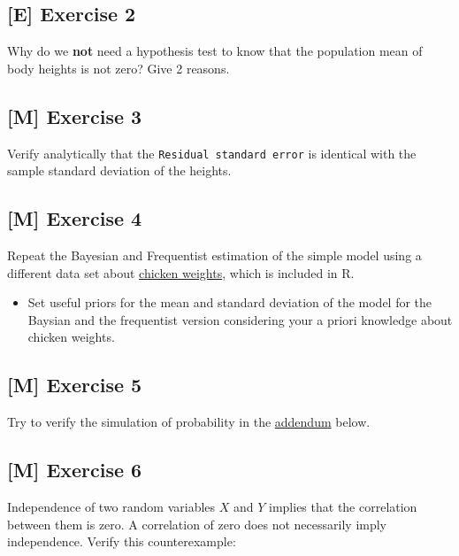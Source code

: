 \documentclass[
]{book}
\providecommand{\tightlist}{%
  \setlength{\itemsep}{0pt}\setlength{\parskip}{0pt}}
\begin{document}
\subsection{{[}E{]} Exercise 2}\label{exercise2_Intro}

Why do we \textbf{not} need a hypothesis test to know that the population mean of body heights is not zero?
Give 2 reasons.

\subsection{{[}M{]} Exercise 3}\label{exercise3_Intro}

Verify analytically that the \texttt{Residual\ standard\ error} is identical with
the sample standard deviation of the heights.

\subsection{{[}M{]} Exercise 4}\label{exercise4_Intro}

Repeat the Bayesian and Frequentist estimation of the simple model using a different data set about
\href{https://stat.ethz.ch/R-manual/R-devel/library/datasets/html/ChickWeight.html}{chicken weights},
which is included in R.

\begin{itemize}
\tightlist
\item
  Set useful priors for the mean and standard deviation of the model
  for the Baysian and the frequentist version considering
  your a priori knowledge about chicken weights.
\end{itemize}

\subsection{{[}M{]} Exercise 5}\label{exercise5_Intro}

Try to verify the simulation of probability in the \hyperref[addendum]{addendum} below.

\subsection{{[}M{]} Exercise 6}\label{exercise6_Intro}

Independence of two random variables \(X\) and \(Y\) implies that the
correlation between them is zero.
A correlation of zero does not necessarily imply independence. Verify this
counterexample:
\end{document}
